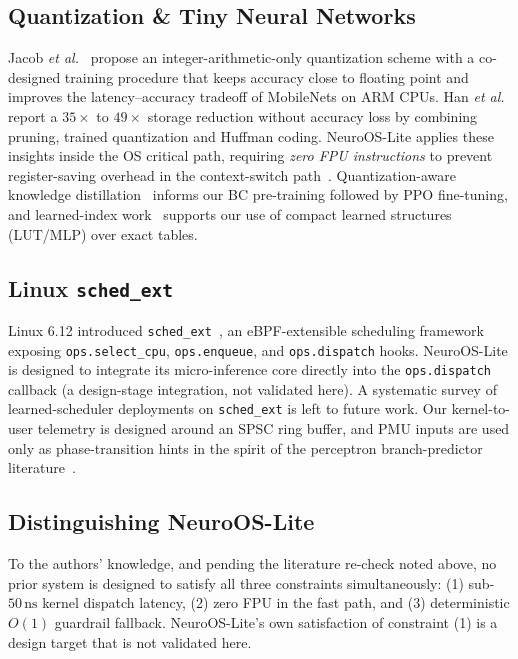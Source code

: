 \subsection{Quantization \& Tiny Neural Networks}

Jacob \textit{et al.}~\cite{Jacob2018} propose an integer-arithmetic-only quantization scheme with a co-designed
training procedure that keeps accuracy close to floating point and improves
the latency--accuracy tradeoff of MobileNets on ARM CPUs. Han
\textit{et al.}~\cite{Han2016} report a $35\times$ to $49\times$ storage
reduction without accuracy loss by combining pruning, trained quantization and
Huffman coding.
NeuroOS-Lite applies these insights inside the OS critical path, requiring
\emph{zero FPU instructions} to prevent register-saving overhead in the
context-switch path~\cite{IntelSysProgGuide}. Quantization-aware knowledge
distillation~\cite{QKD2019} informs our BC pre-training followed by PPO
fine-tuning, and learned-index work~\cite{LearnedIndex2017} supports our use
of compact learned structures (LUT/MLP) over exact tables.

\subsection{Linux \texttt{sched\_ext}}

Linux 6.12 introduced \texttt{sched\_ext}~\cite{schedext2024}, an eBPF-extensible
scheduling framework exposing \texttt{ops.select\_cpu}, \texttt{ops.enqueue},
and \texttt{ops.dispatch} hooks. NeuroOS-Lite is designed to integrate its micro-inference
core directly into the \texttt{ops.dispatch} callback (a design-stage
integration, not validated here). A systematic survey of learned-scheduler deployments on
\texttt{sched\_ext} is left to future work. Our kernel-to-user telemetry is
designed around an SPSC ring buffer, and PMU inputs are used only as
phase-transition hints in the spirit of the perceptron branch-predictor
literature~\cite{JimenezLin2001}.

\subsection{Distinguishing NeuroOS-Lite}

To the authors' knowledge, and pending the literature re-check noted above,
no prior system is designed to satisfy all three constraints simultaneously:
(1) sub-$50\,\text{ns}$ kernel dispatch latency, (2) zero FPU in the fast
path, and (3) deterministic $O(1)$ guardrail fallback. NeuroOS-Lite's own
satisfaction of constraint (1) is a design target that is not validated here.

